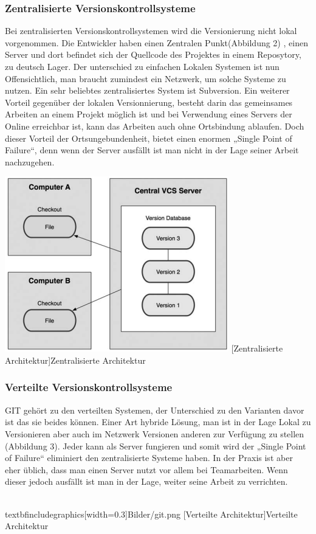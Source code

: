 \documentclass[12pt,a4paper,bibliography=totocnumbered,listof=totocnumbered]{scrartcl}
\begin{document}
\subsubsection{Zentralisierte Versionskontrollsysteme}
Bei zentralisierten Versionskontrollsystemen wird die Versionierung nicht lokal vorgenommen. Die Entwickler haben einen Zentralen Punkt(Abbildung 2) , einen Server und dort befindet sich der Quellcode des Projektes in einem Reposytory, zu deutsch Lager. Der unterschied zu einfachen Lokalen Systemen ist nun Offensichtlich, man braucht zumindest ein Netzwerk, um solche Systeme zu nutzen. Ein sehr beliebtes zentralisiertes System ist Subversion. Ein weiterer Vorteil gegenüber der lokalen Versionnierung, besteht darin das gemeinsames Arbeiten an einem Projekt möglich ist und bei Verwendung eines Servers der Online erreichbar ist, kann das Arbeiten auch ohne Ortsbindung ablaufen. Doch dieser Vorteil der Ortsungebundenheit, bietet einen enormen „Single Point of Failure“, denn wenn der Server ausfällt ist man nicht in der Lage seiner Arbeit nachzugehen.


\vspace{3pt}
\begin{minipage}{\linewidth}
	\centering
	\includegraphics[width=0.3\linewidth]{Bilder/sub.png}
	[Zentralisierte Architektur]{Zentralisierte Architektur\footnotemark }
	\label{fig:osgi}
\end{minipage} 	

\subsubsection{Verteilte Versionskontrollsysteme}
GIT gehört zu den verteilten Systemen, der Unterschied zu den Varianten davor ist das sie beides können. 
Einer Art hybride Lösung, man ist in der Lage Lokal zu Versionieren aber auch im Netzwerk Versionen anderen zur Verfügung zu stellen (Abbildung 3). Jeder kann als Server fungieren und somit  wird der „Single Point of Failure“ eliminiert den zentralisierte Systeme haben. In der Praxis ist aber eher üblich, dass man einen Server nutzt vor allem bei Teamarbeiten. Wenn dieser jedoch ausfällt ist man in der Lage, weiter seine Arbeit zu verrichten.
\newline
\vspace{3pt}
\begin{minipage}{\linewidth}
	\centering
	\\textbf{includegraphics[width=0.3\linewidth]{Bilder/git.png}}
	[Verteilte Architektur]{Verteilte Architektur\footnotemark }
	\label{fig:osgi}
\end{minipage}
   
\end{document}
